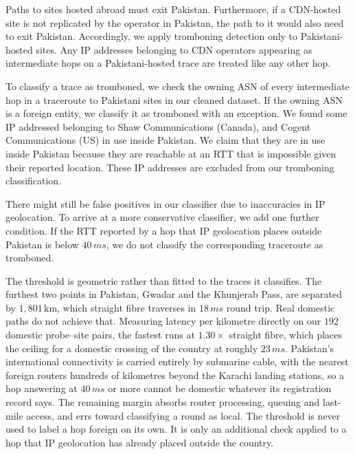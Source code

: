 \documentclass[sigconf,anonymous,10pt]{acmart}
\begin{document}
Paths to sites hosted abroad must exit Pakistan. Furthermore, if a CDN-hosted site is not replicated by the operator in Pakistan, the path to it would also need to exit Pakistan. Accordingly, we apply tromboning detection only to Pakistani-hosted sites. %
Any IP addresses belonging to CDN operators appearing as intermediate hops on a Pakistani-hosted trace are treated like any other hop. 

To classify a trace as tromboned, we check the owning ASN of every intermediate hop in a traceroute to Pakistani sites in our cleaned dataset. If the owning ASN is a foreign entity, we classify it as tromboned with an exception. We found some IP addressed belonging to Shaw Communications (Canada), and Cogent Communications (US) in use inside Pakistan. We claim that they are in use inside Pakistan because they are reachable at an RTT that is impossible given their reported location. These IP addresses are excluded from our tromboning classification. 

There might still be false positives in our classifier due to inaccuracies in IP geolocation. To arrive at a more conservative classifier, we add one further condition. If the RTT reported by a hop that IP geolocation places outside Pakistan is below $40\,ms$, we do not classify the corresponding traceroute as tromboned.

The threshold is geometric rather than fitted to the traces it classifies. The furthest two points in Pakistan, Gwadar and the Khunjerab Pass, are separated by $1{,}801$\,km, which straight fibre traverses in $18\,ms$ round trip. Real domestic paths do not achieve that. Measuring latency per kilometre directly on our $192$ domestic probe--site pairs, the fastest runs at $1.30\times$ straight fibre, which places the ceiling for a domestic crossing of the country at roughly $23\,ms$. Pakistan's international connectivity is carried entirely by submarine cable, with the nearest foreign routers hundreds of kilometres beyond the Karachi landing stations, so a hop answering at $40\,ms$ or more cannot be domestic whatever its registration record says. The remaining margin absorbs router processing, queuing and last-mile access, and errs toward classifying a round as local. The threshold is never used to label a hop foreign on its own. It is only an additional check applied to a hop that IP geolocation has already placed outside the country.
\end{document}
